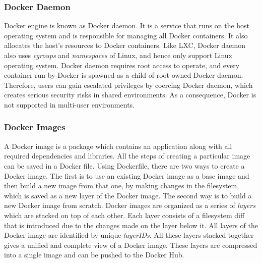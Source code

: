 \subsubsection{Docker Daemon}
Docker engine is known as Docker daemon. It is a service that runs on the
host operating system and is responsible for managing all Docker containers.
It also allocates the host’s resources to Docker containers. Like LXC, Docker
daemon also uses \textit{cgroups} and \textit{namespaces} of Linux, and hence only support
Linux operating system. Docker daemon requires root access to operate, and
every container run by Docker is spawned as a child of root-owned Docker 
daemon. Therefore, users can gain escalated privileges by coercing Docker daemon,
which creates serious security risks in shared environments. As a consequence,
Docker is not supported in multi-user environments.

\subsubsection{Docker Images}
A Docker image is a package which contains an application along with all 
required dependencies and libraries. All the steps of creating a particular image
can be saved in a Docker file. Using Dockerfile, there are two ways to create
a Docker image. The first is to use an existing Docker image as a base image
and then build a new image from that one, by making changes in the filesystem,
which is saved as a new layer of the Docker image. The second way is to build
a new Docker image from scratch. Docker images are organized as a series of
\textit{layers} which are stacked on top of each other. Each layer consists of a filesystem
diff that is introduced due to the changes made on the layer below it. All layers
of the Docker image are identified by unique \textit{layerIDs}. All these layers stacked
together gives a unified and complete view of a Docker image. These layers are
compressed into a single image and can be pushed to the Docker Hub.

